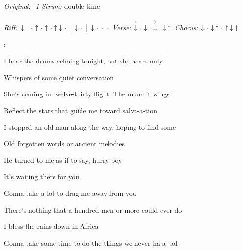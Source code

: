 \begin{song}


\begin{headerbox}
 \quad
\textit{Original: -1} \quad
\textit{Strum:} double time \par
\textit{Riff:} $\Down\Miss\Miss\Up\Miss\Up\Miss\Up\Down\Miss \Separator \Down\Miss \Separator \Down\Miss\Miss\Miss$ \quad
\textit{Verse:} $\AccentDown\Miss\Down\Miss\AccentDown\Miss\Down\Up$ \quad
\textit{Chorus:} $\Down\Miss\Down\Up\Miss\Up\Down\Up$
\end{headerbox}

\begin{hchordbox}
\end{hchordbox}

\large

\bigskip

\Intro\textbf{:}     \par

\bigskip

 I hear the drums echoing tonight, but she hears only \par
{}Whispers of some quiet conversation  \par
{} She's coming in twelve-thirty flight. The moonlit wings \par
Reflect the stars that guide me toward salva-a-tion  \par
{} I stopped an old man along the way, hoping to find some \par
{}Old forgotten words or ancient melodies  \par
{} He turned to me as if to say, hurry boy \par
It's waiting there for you  \par

\bigskip

\begin{chorusboxwide}{\Chorus}
 Gonna take a lot to drag me away from you \par
{} There's nothing that a hundred men or more could ever do \par
{} I bless the rains down in Africa \par
{} Gonna take some time to do the things we never ha-a--ad \par
{}   \par
{}   \par
\end{chorusboxwide}


\end{song}
